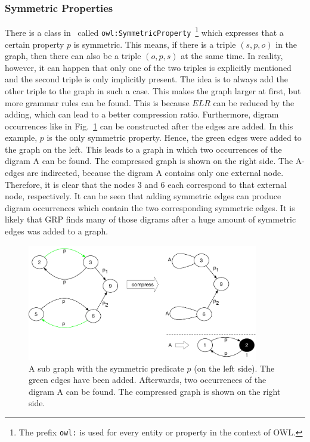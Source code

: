\subsubsection{Symmetric Properties}

There is a class in~\cite{owl} called {\tt owl:SymmetricProperty}~\footnote{The prefix {\tt owl:} is used for every entity or property in the context of OWL.} which expresses that a certain property $p$ is symmetric. This means, if there is a triple $(s,p,o)$ in the graph, then there can also be a triple $(o,p,s)$ at the same time. In reality, however, it can happen that only one of the two triples is explicitly mentioned and the second triple is only implicitly present. The idea is to always add the other triple to the graph in such a case. This makes the graph larger at first, but more grammar rules can be found. This is because $ELR$ can be reduced by the adding, which can lead to a better compression ratio. Furthermore, digram occurrences like in Fig.~\ref{fig:symDirectReplacement} can be constructed after the edges are added. In this example, $p$ is the only symmetric property. Hence, the green edges were added to the graph on the left. This leads to a graph in which two occurrences of the digram A can be found. The compressed graph is shown on the right side. The A-edges are indirected, because the digram A contains only one external node. Therefore, it is clear that the nodes 3 and 6 each correspond to that external node, respectively. It can be seen that adding symmetric edges can produce digram occurrences which contain the two corresponding symmetric edges. It is likely that GRP finds many of those digrams after a huge amount of symmetric edges was added to a graph.

\begin{figure}[h]
	\centering
	\includegraphics[width=0.9\textwidth]{figures/approach/symmetricMatEx2}
	\caption{A sub graph with the symmetric predicate $p$ (on the left side). The green edges have been added. Afterwards, two occurrences of the digram A can be found. The compressed graph is shown on the right side.}
	\label{fig:symDirectReplacement}
\end{figure}

